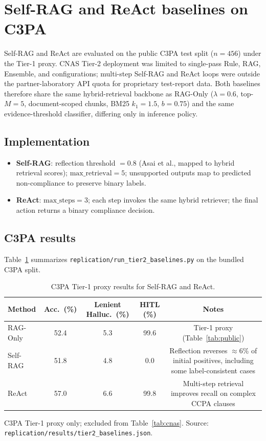 \section{Self-RAG and ReAct baselines on C3PA}
\label{app:tier2_transfer}

Self-RAG \cite{asai2023selfrag} and ReAct \cite{yao2023react} are evaluated on the public C3PA test split ($n{=}456$) under the Tier-1 proxy. CNAS Tier-2 deployment was limited to single-pass Rule, RAG, Ensemble, and \HRAG{} configurations; multi-step Self-RAG and ReAct loops were outside the partner-laboratory API quota for proprietary test-report data. Both baselines therefore share the same hybrid-retrieval backbone as RAG-Only ($\lambda{=}0.6$, top-$M{=}5$, document-scoped chunks, BM25 $k_1{=}1.5$, $b{=}0.75$) and the same evidence-threshold classifier, differing only in inference policy.

\subsection{Implementation}
\label{app:tier2_impl}
\begin{itemize}
  \item \textbf{Self-RAG}: reflection threshold $=0.8$ (Asai et al., mapped to hybrid retrieval scores); $\mathrm{max\_retrieval}{=}5$; unsupported outputs map to predicted non-compliance to preserve binary labels.
  \item \textbf{ReAct}: $\mathrm{max\_steps}{=}3$; each step invokes the same hybrid retriever; the final action returns a binary compliance decision.
\end{itemize}

\subsection{C3PA results}
\label{app:tier2_results}

Table~\ref{tab:tier2_transfer} summarizes \texttt{replication/run\_tier2\_baselines.py} on the bundled C3PA split.

\begin{table}[t]
\centering
\caption{C3PA Tier-1 proxy results for Self-RAG and ReAct.}
\label{tab:tier2_transfer}
\footnotesize
\begin{tabular}{@{}lcccc@{}}
\toprule
Method & Acc.\ (\%) & Lenient Halluc.\ (\%) & HITL (\%) & Notes \\
\midrule
RAG-Only & 52.4 & 5.3 & 99.6 & Tier-1 proxy (Table~\ref{tab:public}) \\
Self-RAG & 51.8 & 4.8 & 0.0 & Reflection reverses ${\approx}$6\% of initial positives, including some label-consistent cases \\
ReAct    & 57.0 & 6.6 & 99.8 & Multi-step retrieval improves recall on complex CCPA clauses \\
\bottomrule
\end{tabular}
\par\vspace{0.3em}
{\footnotesize C3PA Tier-1 proxy only; excluded from Table~\ref{tab:cnas}. Source: \texttt{replication/results/tier2\_baselines.json}.}
\end{table}

